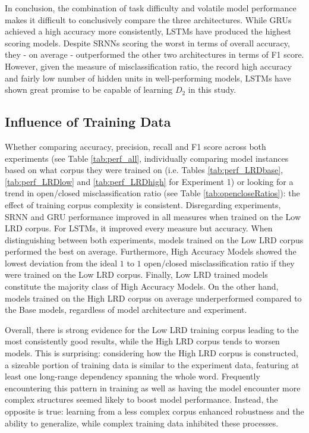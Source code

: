 In conclusion, the combination of task difficulty and volatile model performance makes it difficult to conclusively compare the three architectures. While GRUs achieved a high accuracy more consistently, LSTMs have produced the highest scoring models. Despite SRNNs scoring the worst in terms of overall accuracy, they - on average - outperformed the other two architectures in terms of F1 score. However, given the measure of misclassification ratio, the record high accuracy and fairly low number of hidden units in well-performing models, LSTMs have shown great promise to be capable of learning $D_{2}$ in this study.

\subsection{Influence of Training Data}
Whether comparing accuracy, precision, recall and F1 score across both experiments (see Table \ref{tab:perf_all}, individually comparing model instances based on what corpus they were trained on (i.e. Tables \ref{tab:perf_LRDbase}, \ref{tab:perf_LRDlow} and \ref{tab:perf_LRDhigh} for Experiment 1) or looking for a trend in open/closed misclassification ratio (see Table \ref{tab:opencloseRatios}): the effect of training corpus complexity is consistent. Disregarding experiments, SRNN and GRU performance improved in all measures when trained on the Low LRD corpus. For LSTMs, it improved every measure but accuracy. When distinguishing between both experiments, models trained on the Low LRD corpus performed the best on average. Furthermore, High Accuracy Models showed the lowest deviation from the ideal $1$ to $1$ open/closed misclassification ratio if they were trained on the Low LRD corpus. Finally, Low LRD trained models constitute the majority class of High Accuracy Models. On the other hand, models trained on the High LRD corpus on average underperformed compared to the Base models, regardless of model architecture and experiment.

Overall, there is strong evidence for the Low LRD training corpus leading to the most consistently good results, while the High LRD corpus tends to worsen models. This is surprising: considering how the High LRD corpus is constructed, a sizeable portion of training data is similar to the experiment data, featuring at least one long-range dependency spanning the whole word. Frequently encountering this pattern in training as well as having the model encounter more complex structures seemed likely to boost model performance. Instead, the opposite is true: learning from a less complex corpus enhanced robustness and the ability to generalize, while complex training data inhibited these processes.

